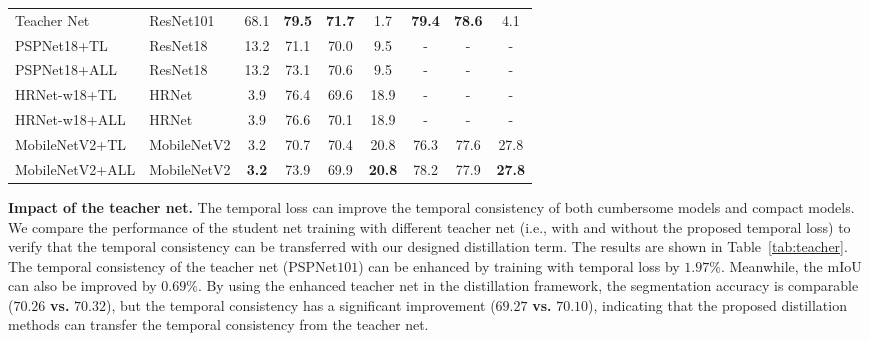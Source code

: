 \documentclass[runningheads]{llncs}
\begin{document}
\begin{table}[h]
\begin{tabular}{l|l|c|c|c|c|c|c|c}
Teacher Net & ResNet101               & 68.1                    & \textbf{79.5}     &\textbf{71.7}     &  1.7    & \textbf{79.4}       &\textbf{78.6}      & 4.1\\
  PSPNet18+TL                                  & ResNet18              & 13.2                    & 71.1     & 70.0     & 9.5   & -       & -      & -       \\
                   PSPNet18+ALL                                    &  ResNet18                    & 13.2                    & 73.1     & 70.6     & 9.5    & -       & -      & -       \\
                   HRNet-w18+TL                                   & HRNet                     & 3.9                     & 76.4     & 69.6     & 18.9     & -       & -      & -       \\
                   HRNet-w18+ALL                                   & HRNet                     & 3.9                     & 76.6     & 70.1     & 18.9     & -       & -      & -       \\
                   MobileNetV2+TL                                 & MobileNetV2           & 3.2                     & 70.7     & 70.4     & 20.8     & 76.3    & 77.6   & 27.8    \\
                   MobileNetV2+ALL                                 & MobileNetV2      & \textbf{3.2}                     & 73.9     & 69.9     & \textbf{20.8}     & 78.2    & 77.9   & \textbf{27.8 }   \\\bottomrule
\end{tabular}
\label{SOTA}
\end{table}


\noindent\textbf{Impact of the teacher net.}
The temporal loss can improve the temporal consistency of both cumbersome models and compact models. We compare the performance of the student net training with different teacher net (i.e., with and without the proposed temporal loss) to verify that the temporal consistency can be transferred with our designed distillation term. The results are shown in Table~\ref{tab:teacher}. The temporal consistency of the teacher net (PSPNet$101$) can be enhanced by training with temporal loss by $1.97\%$. Meanwhile, the mIoU can also be improved by $0.69\%$.  By using the enhanced teacher net in the distillation framework, the segmentation accuracy is comparable ($70.26$ \textbf{vs.} $70.32$), but the temporal consistency has a significant improvement ($69.27$ \textbf{vs.} $70.10$), indicating that the proposed distillation methods can transfer the temporal consistency from the teacher net.
\end{document}
